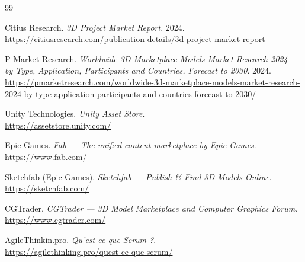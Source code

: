 \documentclass[12pt, a4paper, oneside]{report}
\begin{document}
\clearpage
{}
\setcounter{page}{1}









\clearpage
\renewcommand{\bibname}{Webography}
\begin{thebibliography}{99}


Citius Research. \textit{3D Project Market Report}. 2024.\\
\url{https://citiusresearch.com/publication-details/3d-project-market-report} 

P Market Research. \textit{Worldwide 3D Marketplace Models Market Research 2024 ---
by Type, Application, Participants and Countries, Forecast to 2030}. 2024.\\
\url{https://pmarketresearch.com/worldwide-3d-marketplace-models-market-research-2024-by-type-application-participants-and-countries-forecast-to-2030/} 

Unity Technologies. \textit{Unity Asset Store}.\\
\url{https://assetstore.unity.com/} 

Epic Games. \textit{Fab --- The unified content marketplace by Epic Games}.\\
\url{https://www.fab.com/} 

Sketchfab (Epic Games). \textit{Sketchfab --- Publish \& Find 3D Models Online}.\\
\url{https://sketchfab.com/} 

CGTrader. \textit{CGTrader --- 3D Model Marketplace and Computer Graphics Forum}.\\
\url{https://www.cgtrader.com/} 

AgileThinkin.pro. \textit{Qu'est-ce que Scrum ?}.\\
\url{https://agilethinking.pro/quest-ce-que-scrum/} 


\end{thebibliography}
\end{document}
